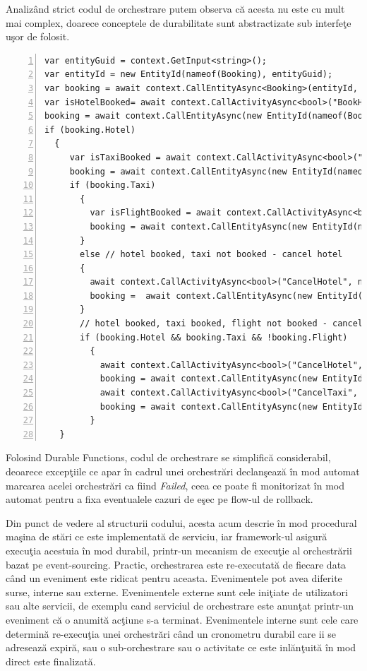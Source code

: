  \par Analizând strict codul de orchestrare putem observa că acesta nu este cu mult mai complex, doarece conceptele de durabilitate sunt abstractizate sub interfeţe uşor de folosit. 
\begin{lstlisting}[numbers=left]
var entityGuid = context.GetInput<string>();
var entityId = new EntityId(nameof(Booking), entityGuid);
var booking = await context.CallEntityAsync<Booking>(entityId, "Get");
var isHotelBooked= await context.CallActivityAsync<bool>("BookHotel", null);
booking = await context.CallEntityAsync(new EntityId(nameof(Booking), entityGuid),"UpdateHotel", isHotelBooked);
if (booking.Hotel)
  {
     var isTaxiBooked = await context.CallActivityAsync<bool>("BookTaxi", null);
     booking = await context.CallEntityAsync(new EntityId(nameof(Booking), entityGuid),"UpdateTaxi", isTaxiBooked);
     if (booking.Taxi)
       {
         var isFlightBooked = await context.CallActivityAsync<bool>("BookFlight", null);
         booking = await context.CallEntityAsync(new EntityId(nameof(Booking), entityGuid),"UpdateFlight", isFlightBooked);
       }
       else // hotel booked, taxi not booked - cancel hotel
       {
         await context.CallActivityAsync<bool>("CancelHotel", null);
         booking =  await context.CallEntityAsync(new EntityId(nameof(Booking), entityGuid),"UpdateHotel", false);
       }
       // hotel booked, taxi booked, flight not booked - cancel hotel & taxi
       if (booking.Hotel && booking.Taxi && !booking.Flight)
         {
           await context.CallActivityAsync<bool>("CancelHotel", null);
           booking = await context.CallEntityAsync(new EntityId(nameof(Booking), entityGuid),"UpdateHotel", false);
           await context.CallActivityAsync<bool>("CancelTaxi", null);
           booking = await context.CallEntityAsync(new EntityId(nameof(Booking), entityGuid),	"UpdateTaxi", false);
         }
   }
\end{lstlisting}
\par Folosind Durable Functions, codul de orchestrare se simplifică considerabil, deoarece excepţiile ce apar în cadrul unei orchestrări declanşează în mod automat marcarea acelei orchestrări ca fiind \emph{Failed}, ceea ce poate fi monitorizat în mod automat pentru a fixa eventualele cazuri de eşec pe flow-ul de rollback. 
\par Din punct de vedere al structurii codului, acesta acum descrie în mod procedural maşina de stări ce este implementată de serviciu, iar framework-ul asigură execuţia acestuia în mod durabil, printr-un mecanism de execuţie al orchestrării bazat pe event-sourcing. Practic, orchestrarea este re-executată de fiecare data când un eveniment este ridicat pentru aceasta. Evenimentele pot avea diferite surse, interne sau externe. Evenimentele externe sunt cele iniţiate de utilizatori sau alte servicii, de exemplu cand serviciul de orchestrare este anunţat printr-un eveniment că o anumită acţiune s-a terminat. Evenimentele interne sunt cele care determină re-execuţia unei orchestrări când un cronometru durabil care ii se adresează expiră, sau o sub-orchestrare sau o activitate ce este inlănţuită în mod direct este finalizată. 
